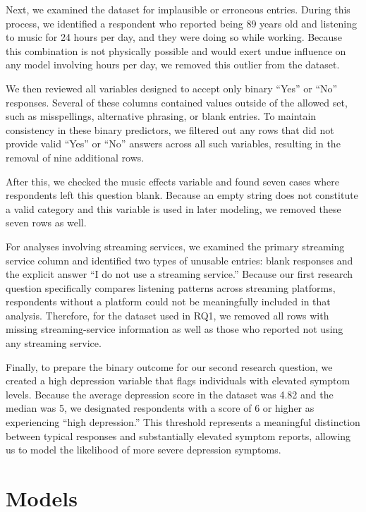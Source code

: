 \documentclass[
  letterpaper,
  DIV=11,
  numbers=noendperiod]{scrartcl}
\begin{document}
Next, we examined the dataset for implausible or erroneous entries.
During this process, we identified a respondent who reported being 89
years old and listening to music for 24 hours per day, and they were
doing so while working. Because this combination is not physically
possible and would exert undue influence on any model involving hours
per day, we removed this outlier from the dataset.

We then reviewed all variables designed to accept only binary ``Yes'' or
``No'' responses. Several of these columns contained values outside of
the allowed set, such as misspellings, alternative phrasing, or blank
entries. To maintain consistency in these binary predictors, we filtered
out any rows that did not provide valid ``Yes'' or ``No'' answers across
all such variables, resulting in the removal of nine additional rows.

After this, we checked the music effects variable and found seven cases
where respondents left this question blank. Because an empty string does
not constitute a valid category and this variable is used in later
modeling, we removed these seven rows as well.

For analyses involving streaming services, we examined the primary
streaming service column and identified two types of unusable entries:
blank responses and the explicit answer ``I do not use a streaming
service.'' Because our first research question specifically compares
listening patterns across streaming platforms, respondents without a
platform could not be meaningfully included in that analysis. Therefore,
for the dataset used in RQ1, we removed all rows with missing
streaming-service information as well as those who reported not using
any streaming service.

Finally, to prepare the binary outcome for our second research question,
we created a high depression variable that flags individuals with
elevated symptom levels. Because the average depression score in the
dataset was 4.82 and the median was 5, we designated respondents with a
score of 6 or higher as experiencing ``high depression.'' This threshold
represents a meaningful distinction between typical responses and
substantially elevated symptom reports, allowing us to model the
likelihood of more severe depression symptoms.

\section{Models}\label{models}
\end{document}
